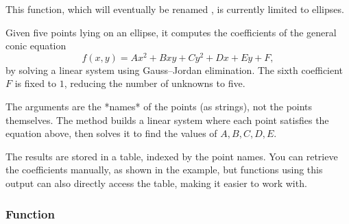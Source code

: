 This function, which will eventually be renamed , is currently limited to ellipses.

Given five points lying on an ellipse, it computes the coefficients of the general conic equation
\[
f(x, y) = Ax^2 + Bxy + Cy^2 + Dx + Ey + F,
\]
by solving a linear system using Gauss–Jordan elimination.
The sixth coefficient \( F \) is fixed to \( 1 \), reducing the number of unknowns to five.

The arguments are the *names* of the points (as strings), not the points themselves. The method builds a linear system where each point satisfies the equation above, then solves it to find the values of \( A, B, C, D, E \).

The results are stored in a table, indexed by the point names. You can retrieve the coefficients manually, as shown in the example, but functions using this output can also directly access the table, making it easier to work with.

\vspace{1em}

\begin{tkzexample}[latex=.35\textwidth]
\end{tkzexample}

\subsubsection{Function }
\label{ssub:function_ellipse_axes_angle}


